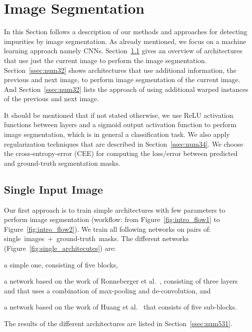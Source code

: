 \section{Image Segmentation}
\label{sec:num3}

In this Section follows a description of our methods and approaches for detecting impurities by image segmentation. As already mentioned, we focus on a machine learning approach namely CNNs. Section~\ref{ssec:num31} gives an overview of architectures that use just the current image to perform the image segmentation. Section~\ref{ssec:num32} shows architectures that use additional information, the previous and next image, to perform image segmentation of the current image. And Section~\ref{ssec:num32} lists the approach of using additional warped instances of the previous and next image.

It should be mentioned that if not stated otherwise, we use ReLU activation functions between layers and a sigmoid output activation function to perform image segmentation, which is in general a classification task.  We also apply regularization techniques that are described in Section~\ref{ssec:num34}. We choose the cross-entropy-error (CEE) for computing the loss/error between predicted and ground-truth segmentation masks.


\subsection{Single Input Image}
\label{ssec:num31}

Our first approach is to train simple architectures with few parameters to perform image segmentation (workflow: from Figure~\ref{fig:intro_flow1} to Figure~\ref{fig:intro_flow2}). We train all following networks on pairs of: single~images~+~ground-truth~masks. The different networks (Figure~\ref{fig:single_architecutes}) are: \begin{enumerate*}[label=(\alph*)]\item a simple one, consisting of five blocks, \item a network based on the work of Ronneberger et al.~\cite{Ronneberger15}, consisting of three layers and that uses a combination of max-pooling and de-convolution, and \item a network based on the work of Huang et al.~\cite{Huang16} that consists of five sub-blocks.\end{enumerate*}
The results of the different architectures are listed in Section~\ref{ssec:num531}.

